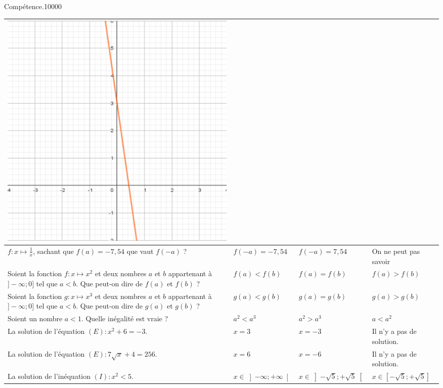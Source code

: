 \begin{pageAuto}
\begin{ExoAutoN}{Compétence.}{1}{0}{0}{0}{0}
\begin{tabular}{|M{.4\linewidth}|M{.17\linewidth}|M{.17\linewidth}|M{.17\linewidth}|}
\includegraphics[width=\linewidth]{FIG/image853.png} 
\\\hline
$f:x\mapsto \frac{1}{x}$, sachant que $f(a)=-7,54$ que vaut $f(-a)$ ? & $f(-a)=-7,54$ & $f(-a)=7,54$ & On ne peut pas savoir \\\hline
Soient la fonction $f:x\mapsto x^2$ et deux nombres $a$ et $b$ appartenant à $]-\infty;0]$ tel que $a<b$. Que peut-on dire de $f(a)$ et $f(b)$ ? & $f(a)<f(b)$ & $f(a)=f(b)$ & $f(a)>f(b)$ \\\hline
Soient la fonction $g:x\mapsto x^3$ et deux nombres $a$ et $b$ appartenant à $]-\infty;0]$ tel que $a<b$. Que peut-on dire de $g(a)$ et $g(b)$ ? & $g(a)<g(b)$ & $g(a)=g(b)$ & $g(a)>g(b)$ \\\hline
Soient un nombre $a<1$. Quelle inégalité est vraie ? & $a^2<a^3$ & $a^2>a^3$ & $a<a^2$ \\\hline
La solution de l'équation $(E):x^2+6=-3$. & $x=3$ & $x=-3$ & Il n'y a pas de solution. \\\hline
La solution de l'équation $(E):7\sqrt{x}+4=256$. & $x=6$ & $x=-6$ & Il n'y a pas de solution. \\\hline
La solution de l'inéquation $(I):x^2<5$. & $x\in\left]-\infty;+\infty\right[$ & $x\in\left]-\sqrt{5};+\sqrt{5}\right[$ & $x\in\left[-\sqrt{5};+\sqrt{5}\right]$ \\\hline
\end{tabular}
\end{ExoAutoN}

\end{pageAuto} %

